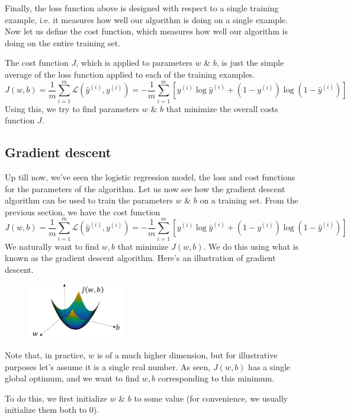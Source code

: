 \documentclass{article}[a4paper,12pt]
\theoremstyle{definition}
\newcommand{\Lagr}{\mathcal{L}}
\begin{document}
Finally, the loss function above is designed with respect to a single training example, i.e. it measures how well our algorithm is doing on a single example. Now let us define the cost function, which measures how well our algorithm is doing on the entire training set.
\vspace{6pt}

The cost function $J$, which is applied to parameters $w$ \& $b$, is just the simple average of the loss function applied to each of the training examples.
$$\boxed{J(w,b)=\dfrac{1}{m}\sum_{i=1}^{m}\Lagr(\hat{y}^{(i)},y^{(i)})=-\dfrac{1}{m}\sum_{i=1}^{m}\left[y^{(i)}\log\hat{y}^{(i)}+(1-y^{(i)})\log(1-\hat{y}^{(i)})\right]}$$
Using this, we try to find parameters $w$ \& $b$ that minimize the overall costs function $J$. 
\subsection{Gradient descent}
Up till now, we've seen the logistic regression model, the loss and cost functions for the parameters of the algorithm. Let us now see how the gradient descent algorithm can be used to train the parameters $w$ \& $b$ on a training set. From the previous section, we have the cost function
$$J(w,b)=\dfrac{1}{m}\sum_{i=1}^{m}\Lagr(\hat{y}^{(i)},y^{(i)})=-\dfrac{1}{m}\sum_{i=1}^{m}\left[y^{(i)}\log\hat{y}^{(i)}+(1-y^{(i)})\log(1-\hat{y}^{(i)})\right]$$
We naturally want to find $w, b$ that minimize $J(w,b)$. We do this using what is known as the gradient descent algorithm. Here's an illustration of gradient descent.
\begin{figure}
\centering \includegraphics[width=0.38\textwidth]{gradient_descent.png}
\end{figure}
\vspace{6pt}

Note that, in practice, $w$ is of a much higher dimension, but for illustrative purposes let's assume it is a single real number. As seen, $J(w,b)$ has a single global optimum, and we want to find $w,b$ corresponding to this minimum.
\vspace{6pt}

To do this, we first initialize $w$ \& $b$ to some value (for convenience, we usually initialize them both to 0).
\vspace{6pt}
\end{document}
